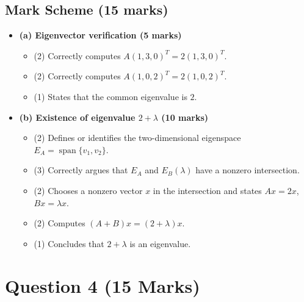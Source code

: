 \documentclass[12pt]{article}
\newcommand{\Span}{\operatorname{span}}
\begin{document}
\subsection{Mark Scheme (15 marks)}
\begin{itemize}[leftmargin=1.6em]
  \item \textbf{(a) Eigenvector verification (5 marks)}
  \begin{itemize}[leftmargin=1.6em]
    \item (2) Correctly computes $A(1,3,0)^T=2(1,3,0)^T$.
    \item (2) Correctly computes $A(1,0,2)^T=2(1,0,2)^T$.
    \item (1) States that the common eigenvalue is $2$.
  \end{itemize}
  \item \textbf{(b) Existence of eigenvalue $2+\lambda$ (10 marks)}
  \begin{itemize}[leftmargin=1.6em]
    \item (2) Defines or identifies the two-dimensional eigenspace $E_A=\Span\{v_1,v_2\}$.
     \item (3) Correctly argues that $E_A$ and $E_B(\lambda)$ have a nonzero intersection.
    \item (2) Chooses a nonzero vector $x$ in the intersection and states $Ax=2x$, $Bx=\lambda x$.
    \item (2) Computes $(A+B)x=(2+\lambda)x$.
    \item (1) Concludes that $2+\lambda$ is an eigenvalue.
  \end{itemize}
\end{itemize}

\newpage
\section{Question 4 \hfill (15 Marks)}
\end{document}
